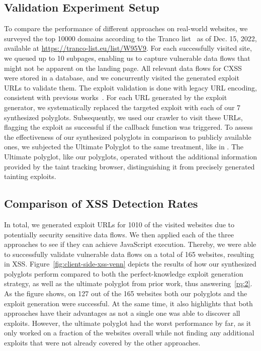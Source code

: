 \subsection{Validation Experiment Setup}\label{sec:tainting-experiment}
To compare the performance of different approaches on real-world websites, we surveyed the top \num{10000} domains according to the Tranco list~\cite{le-pochat-tranco} as of Dec. 15, 2022, available at \url{https://tranco-list.eu/list/W95V9}.
For each successfully visited site, we queued up to \num{10} subpages, enabling us to capture vulnerable data flows that might not be apparent on the landing page.
All relevant data flows for CXSS were stored in a database, and we concurrently visited the generated exploit URLs to validate them.
The exploit validation is done with legacy URL encoding, consistent with previous works~\cite{LekStoJoh13,MelDasShaBau+18,SteRosJohSto+19,KleBarBen+22}.
For each URL generated by the exploit generator, we systematically replaced the targeted exploit with each of our 7 synthesized polyglots.
Subsequently, we used our crawler to visit these URLs, flagging the exploit as successful if the callback function was triggered.
To assess the effectiveness of our synthesized polyglots in comparison to publicly available ones, we subjected the Ultimate \xss{} Polyglot to the same treatment, like in .
The Ultimate polyglot, like our polyglots, operated without the additional information provided by the taint tracking browser, distinguishing it from precisely generated tainting exploits.

\subsection{Comparison of XSS Detection Rates}\label{sec:tainting-evaluation}
In total, we generated exploit URLs for \num{1010} of the visited websites due to potentially security sensitive data flows.
We then applied each of the three approaches to see if they can achieve JavaScript execution.
Thereby, we were able to successfully validate vulnerable data flows on a total of \num{165} websites, resulting in XSS\@.
Figure~\ref{fig:client-side-xss-venn} depicts the results of how our synthesized polyglots perform compared to both the perfect-knowledge exploit generation strategy, as well as the ultimate polyglot from prior work, thus answering~\ref{rq:2}.
As the figure shows, on \num{127} out of the \num{165} websites both our polyglots and the exploit generation were successful.
At the same time, it also highlights that both approaches have their advantages as not a single one was able to discover all exploits.
However, the ultimate polyglot had the worst performance by far, as it only worked on a fraction of the websites overall while not finding any additional exploits that were not already covered by the other approaches.

